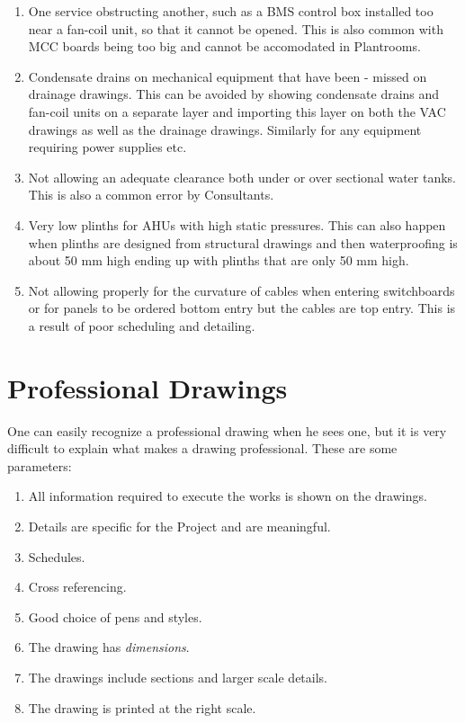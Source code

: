\begin{enumerate}
\item One service obstructing another, such as a BMS control box installed too near a fan-coil unit, so that it cannot be opened. This is also common with MCC
boards being too big and cannot be accomodated in Plantrooms.

\item Condensate drains on mechanical equipment that have been - missed on drainage drawings. This can be avoided by showing condensate drains and fan-coil
units on a separate layer and importing this layer on both the VAC drawings
as well as the drainage drawings. Similarly for any equipment requiring power supplies etc.

\item Not allowing an adequate clearance both under or over sectional water tanks.
		This is also a common error by Consultants.

\item Very low plinths for AHUs with high static pressures. This can also happen
		when plinths are designed from structural drawings and then waterproofing is about
		50 mm high ending up with plinths that are only 50 mm high. 

\item Not allowing properly for the curvature of cables when entering switchboards
		or for panels to be ordered bottom entry but the cables are top entry. This is a 
		result of poor scheduling and detailing.

\end{enumerate}



\section*{Professional Drawings}

One can easily recognize a professional drawing when he sees one, but it is 
very difficult to explain what makes a drawing professional.
These are some parameters:

\begin{enumerate}
\item All information required to execute the works is shown on the drawings.
\item Details are specific for the Project and are meaningful.
\item Schedules.
\item Cross referencing.
\item Good choice of pens and styles.
\item The drawing has \textit{dimensions}. 
\item The drawings include sections and larger scale details.
\item The drawing is printed at the right scale.
\end{enumerate}














